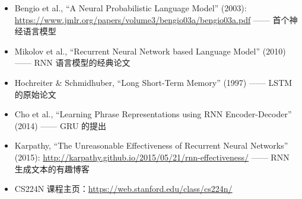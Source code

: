 \documentclass[a4paper]{article}
\begin{document}
\begin{itemize}
    \item Bengio et al., ``A Neural Probabilistic Language Model'' (2003): \url{https://www.jmlr.org/papers/volume3/bengio03a/bengio03a.pdf} —— 首个神经语言模型
    \item Mikolov et al., ``Recurrent Neural Network based Language Model'' (2010) —— RNN 语言模型的经典论文
    \item Hochreiter \& Schmidhuber, ``Long Short-Term Memory'' (1997) —— LSTM 的原始论文
    \item Cho et al., ``Learning Phrase Representations using RNN Encoder-Decoder'' (2014) —— GRU 的提出
    \item Karpathy, ``The Unreasonable Effectiveness of Recurrent Neural Networks'' (2015): \url{http://karpathy.github.io/2015/05/21/rnn-effectiveness/} —— RNN 生成文本的有趣博客
    \item CS224N 课程主页：\url{https://web.stanford.edu/class/cs224n/}
\end{itemize}
\end{document}
